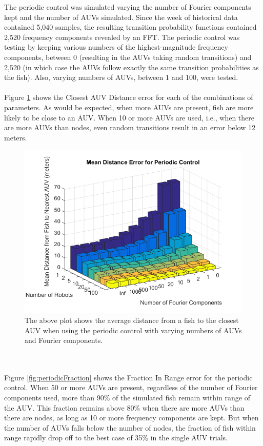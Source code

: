 \documentclass[11pt,letterpaper]{article}
\begin{document}
	The periodic control was simulated varying the number of Fourier components kept and the number of AUVs simulated. Since the week of historical data contained 5,040 samples, the resulting transition probability functions contained 2,520 frequency components revealed by an FFT. The periodic control was testing by keeping various numbers of the highest-magnitude frequency components, between 0 (resulting in the AUVs taking random transitions) and 2,520 (in which case the AUVs follow exactly the same transition probabilities as the fish). Also, varying numbers of AUVs, between 1 and 100, were tested.
	\\\\
	Figure \ref{fig:periodicMeanDistance} shows the Closest AUV Distance error for each of the combinations of parameters. As would be expected, when more AUVs are present, fish are more likely to be close to an AUV. When 10 or more AUVs are used, i.e., when there are more AUVs than nodes, even random transitions result in an error below 12 meters. 
	\begin{figure}
		\centering
		\includegraphics[width = 0.7\linewidth]{results/periodicMeanDistance}
		\caption{The above plot shows the average distance from a fish to the closest AUV when using the periodic control with varying numbers of AUVs and Fourier components.}
		\label{fig:periodicMeanDistance}
	\end{figure}
	\\\\
	Figure \ref{fig:periodicFraction} shows the Fraction In Range error for the periodic control. When 50 or more AUVs are present, regardless of the number of Fourier components used, more than 90\% of the simulated fish remain within range of the AUV. This fraction remains above 80\% when there are more AUVs than there are nodes, as long as 10 or more frequency components are kept. But when the number of AUVs falls below the number of nodes, the fraction of fish within range rapidly drop off to the best case of 35\% in the single AUV trials.
\end{document}
